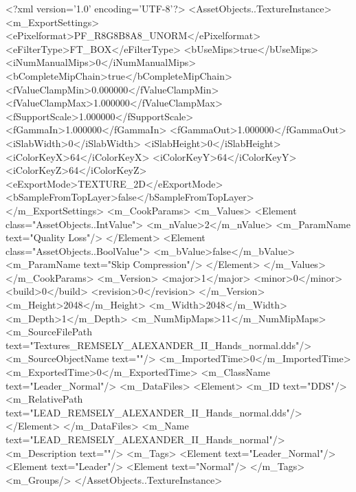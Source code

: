 <?xml version='1.0' encoding='UTF-8'?>
<AssetObjects..TextureInstance>
  <m_ExportSettings>
    <ePixelformat>PF_R8G8B8A8_UNORM</ePixelformat>
    <eFilterType>FT_BOX</eFilterType>
    <bUseMips>true</bUseMips>
    <iNumManualMips>0</iNumManualMips>
    <bCompleteMipChain>true</bCompleteMipChain>
    <fValueClampMin>0.000000</fValueClampMin>
    <fValueClampMax>1.000000</fValueClampMax>
    <fSupportScale>1.000000</fSupportScale>
    <fGammaIn>1.000000</fGammaIn>
    <fGammaOut>1.000000</fGammaOut>
    <iSlabWidth>0</iSlabWidth>
    <iSlabHeight>0</iSlabHeight>
    <iColorKeyX>64</iColorKeyX>
    <iColorKeyY>64</iColorKeyY>
    <iColorKeyZ>64</iColorKeyZ>
    <eExportMode>TEXTURE_2D</eExportMode>
    <bSampleFromTopLayer>false</bSampleFromTopLayer>
  </m_ExportSettings>
  <m_CookParams>
    <m_Values>
      <Element class="AssetObjects..IntValue">
        <m_nValue>2</m_nValue>
        <m_ParamName text="Quality Loss"/>
      </Element>
      <Element class="AssetObjects..BoolValue">
        <m_bValue>false</m_bValue>
        <m_ParamName text="Skip Compression"/>
      </Element>
    </m_Values>
  </m_CookParams>
  <m_Version>
    <major>1</major>
    <minor>0</minor>
    <build>0</build>
    <revision>0</revision>
  </m_Version>
  <m_Height>2048</m_Height>
  <m_Width>2048</m_Width>
  <m_Depth>1</m_Depth>
  <m_NumMipMaps>11</m_NumMipMaps>
  <m_SourceFilePath text="Textures\LEAD_REMSELY_ALEXANDER_II_Hands_normal.dds"/>
  <m_SourceObjectName text=""/>
  <m_ImportedTime>0</m_ImportedTime>
  <m_ExportedTime>0</m_ExportedTime>
  <m_ClassName text="Leader_Normal"/>
  <m_DataFiles>
    <Element>
      <m_ID text="DDS"/>
      <m_RelativePath text="LEAD_REMSELY_ALEXANDER_II_Hands_normal.dds"/>
    </Element>
  </m_DataFiles>
  <m_Name text="LEAD_REMSELY_ALEXANDER_II_Hands_normal"/>
  <m_Description text=""/>
  <m_Tags>
    <Element text="Leader_Normal"/>
    <Element text="Leader"/>
    <Element text="Normal"/>
  </m_Tags>
  <m_Groups/>
</AssetObjects..TextureInstance>
